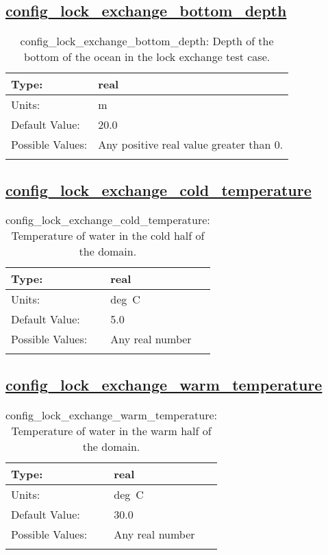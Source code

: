 \subsection[config\_lock\_exchange\_bottom\_depth]{\hyperref[sec:nm_tab_lock_exchange]{config\_lock\_exchange\_bottom\_depth}}
\label{subsec:nm_sec_config_lock_exchange_bottom_depth}
\begin{center}
\begin{longtable}{| p{2.0in} || p{4.0in} |}
    \hline
    Type: & real \\
    \hline
    Units: & \si{m} \\
    \hline
    Default Value: & 20.0 \\
    \hline
    Possible Values: & Any positive real value greater than 0. \\
    \hline
    \caption{config\_lock\_exchange\_bottom\_depth: Depth of the bottom of the ocean in the lock exchange test case.}
\end{longtable}
\end{center}
\subsection[config\_lock\_exchange\_cold\_temperature]{\hyperref[sec:nm_tab_lock_exchange]{config\_lock\_exchange\_cold\_temperature}}
\label{subsec:nm_sec_config_lock_exchange_cold_temperature}
\begin{center}
\begin{longtable}{| p{2.0in} || p{4.0in} |}
    \hline
    Type: & real \\
    \hline
    Units: & \si{deg.C} \\
    \hline
    Default Value: & 5.0 \\
    \hline
    Possible Values: & Any real number \\
    \hline
    \caption{config\_lock\_exchange\_cold\_temperature: Temperature of water in the cold half of the domain.}
\end{longtable}
\end{center}
\subsection[config\_lock\_exchange\_warm\_temperature]{\hyperref[sec:nm_tab_lock_exchange]{config\_lock\_exchange\_warm\_temperature}}
\label{subsec:nm_sec_config_lock_exchange_warm_temperature}
\begin{center}
\begin{longtable}{| p{2.0in} || p{4.0in} |}
    \hline
    Type: & real \\
    \hline
    Units: & \si{deg.C} \\
    \hline
    Default Value: & 30.0 \\
    \hline
    Possible Values: & Any real number \\
    \hline
    \caption{config\_lock\_exchange\_warm\_temperature: Temperature of water in the warm half of the domain.}
\end{longtable}
\end{center}
